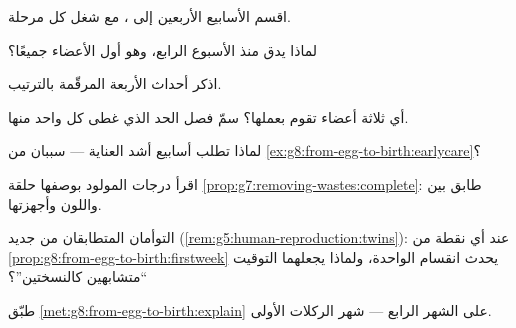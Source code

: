 \begin{exercise}[$\star$]\label{exo:g8:from-egg-to-birth:4}
اقسم الأسابيع الأربعين إلى  ، مع شغل كل
مرحلة.
\end{exercise}

\begin{exercise}[$\star$]\label{exo:g8:from-egg-to-birth:5}
لماذا يدق  منذ الأسبوع الرابع، وهو أول الأعضاء
جميعًا؟
\end{exercise}

\begin{exercise}[$\star$]\label{exo:g8:from-egg-to-birth:6}
اذكر أحداث  الأربعة المرقّمة بالترتيب.
\end{exercise}

\begin{exercise}[$\star\star$]\label{exo:g8:from-egg-to-birth:7}
أي ثلاثة أعضاء تقوم  بعملها؟ سمّ فصل الحد الذي
غطى كل واحد منها.
\end{exercise}

\begin{exercise}[$\star\star$]\label{exo:g8:from-egg-to-birth:8}
لماذا تطلب أسابيع  أشد العناية --- سببان من
\cref{ex:g8:from-egg-to-birth:earlycare}؟
\end{exercise}

\begin{exercise}[$\star\star$]\label{exo:g8:from-egg-to-birth:9}
اقرأ  درجات المولود بوصفها حلقة
\cref{prop:g7:removing-wastes:complete}: طابق بين 
 واللون وأجهزتها.
\end{exercise}

\begin{exercise}[$\star\star$]\label{exo:g8:from-egg-to-birth:10}
التوأمان المتطابقان من جديد
(\cref{rem:g5:human-reproduction:twins}): عند أي نقطة من
\cref{prop:g8:from-egg-to-birth:firstweek} يحدث انقسام
 الواحدة، ولماذا يجعلهما التوقيت ``متشابهين
كالنسختين''؟
\end{exercise}

\begin{exercise}[$\star\star$]\label{exo:g8:from-egg-to-birth:11}
طبّق \cref{met:g8:from-egg-to-birth:explain} على الشهر
الرابع --- شهر الركلات الأولى.
\end{exercise}


